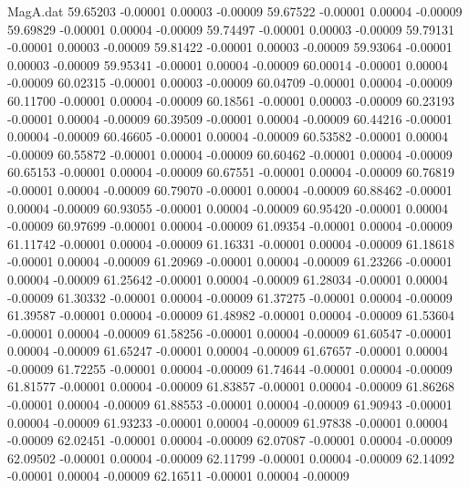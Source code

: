 \begin{filecontents}{MagA.dat}
  59.65203   -0.00001    0.00003   -0.00009
  59.67522   -0.00001    0.00004   -0.00009
  59.69829   -0.00001    0.00004   -0.00009
  59.74497   -0.00001    0.00003   -0.00009
  59.79131   -0.00001    0.00003   -0.00009
  59.81422   -0.00001    0.00003   -0.00009
  59.93064   -0.00001    0.00003   -0.00009
  59.95341   -0.00001    0.00004   -0.00009
  60.00014   -0.00001    0.00004   -0.00009
  60.02315   -0.00001    0.00003   -0.00009
  60.04709   -0.00001    0.00004   -0.00009
  60.11700   -0.00001    0.00004   -0.00009
  60.18561   -0.00001    0.00003   -0.00009
  60.23193   -0.00001    0.00004   -0.00009
  60.39509   -0.00001    0.00004   -0.00009
  60.44216   -0.00001    0.00004   -0.00009
  60.46605   -0.00001    0.00004   -0.00009
  60.53582   -0.00001    0.00004   -0.00009
  60.55872   -0.00001    0.00004   -0.00009
  60.60462   -0.00001    0.00004   -0.00009
  60.65153   -0.00001    0.00004   -0.00009
  60.67551   -0.00001    0.00004   -0.00009
  60.76819   -0.00001    0.00004   -0.00009
  60.79070   -0.00001    0.00004   -0.00009
  60.88462   -0.00001    0.00004   -0.00009
  60.93055   -0.00001    0.00004   -0.00009
  60.95420   -0.00001    0.00004   -0.00009
  60.97699   -0.00001    0.00004   -0.00009
  61.09354   -0.00001    0.00004   -0.00009
  61.11742   -0.00001    0.00004   -0.00009
  61.16331   -0.00001    0.00004   -0.00009
  61.18618   -0.00001    0.00004   -0.00009
  61.20969   -0.00001    0.00004   -0.00009
  61.23266   -0.00001    0.00004   -0.00009
  61.25642   -0.00001    0.00004   -0.00009
  61.28034   -0.00001    0.00004   -0.00009
  61.30332   -0.00001    0.00004   -0.00009
  61.37275   -0.00001    0.00004   -0.00009
  61.39587   -0.00001    0.00004   -0.00009
  61.48982   -0.00001    0.00004   -0.00009
  61.53604   -0.00001    0.00004   -0.00009
  61.58256   -0.00001    0.00004   -0.00009
  61.60547   -0.00001    0.00004   -0.00009
  61.65247   -0.00001    0.00004   -0.00009
  61.67657   -0.00001    0.00004   -0.00009
  61.72255   -0.00001    0.00004   -0.00009
  61.74644   -0.00001    0.00004   -0.00009
  61.81577   -0.00001    0.00004   -0.00009
  61.83857   -0.00001    0.00004   -0.00009
  61.86268   -0.00001    0.00004   -0.00009
  61.88553   -0.00001    0.00004   -0.00009
  61.90943   -0.00001    0.00004   -0.00009
  61.93233   -0.00001    0.00004   -0.00009
  61.97838   -0.00001    0.00004   -0.00009
  62.02451   -0.00001    0.00004   -0.00009
  62.07087   -0.00001    0.00004   -0.00009
  62.09502   -0.00001    0.00004   -0.00009
  62.11799   -0.00001    0.00004   -0.00009
  62.14092   -0.00001    0.00004   -0.00009
  62.16511   -0.00001    0.00004   -0.00009

\end{filecontents}
